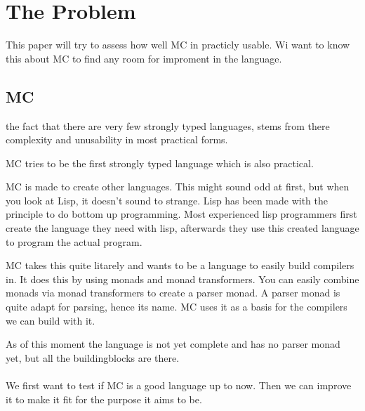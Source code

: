 \section{The Problem}

This paper will try to assess how well MC in practicly usable.
Wi want to know this about MC to find any room for improment in the language.





\subsection{MC}
the fact that there are very few strongly typed languages, stems from there complexity and unusability in most practical forms.

MC tries to be the first strongly typed language which is also practical.

MC is made to create other languages.
This might sound odd at first, but when you look at Lisp, it doesn't sound to strange.
Lisp has been made with the principle to do bottom up programming. \cite{onlisp}
Most experienced lisp programmers first create the language they need with lisp, afterwards they use this created language to program the actual program.

MC takes this quite litarely and wants to be a language to easily build compilers in.
It does this by using monads and monad transformers.
You can easily combine monads via monad transformers to create a parser monad.
A parser monad is quite adapt for parsing, hence its name.
MC uses it as a basis for the compilers we can build with it.

As of this moment the language is not yet complete and has no parser monad yet, but all the buildingblocks are there.

\paragraph{}
We first want to test if MC is a good language up to now. Then we can improve it to make it fit for the purpose it aims to be.
